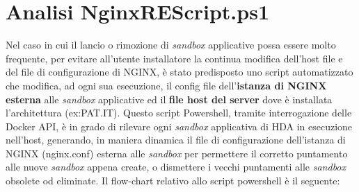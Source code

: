\section{Analisi NginxREScript.ps1}
Nel caso in cui il lancio o rimozione di \textit{sandbox} applicative possa essere molto frequente, per evitare all'utente installatore la continua modifica dell'host file e del file di configurazione di NGINX, è stato predisposto uno script automatizzato che modifica, ad ogni sua esecuzione, il config file dell'\textbf{istanza di NGINX esterna} alle \textit{sandbox} applicative ed il \textbf{file host del server} dove è installata l'architettura (ex:PAT.IT).
Questo script Powershell, tramite interrogazione delle Docker API, è in grado di rilevare ogni \textit{sandbox} applicativa di HDA in esecuzione nell'host, generando, in maniera dinamica il file di configurazione dell'istanza di NGINX (nginx.conf) esterna alle \textit{sandbox} per permettere il corretto puntamento alle nuove \textit{sandbox} appena create, o dismettere i vecchi puntamenti alle \textit{sandbox} obsolete od eliminate. 
Il flow-chart relativo allo script powershell è il seguente:











